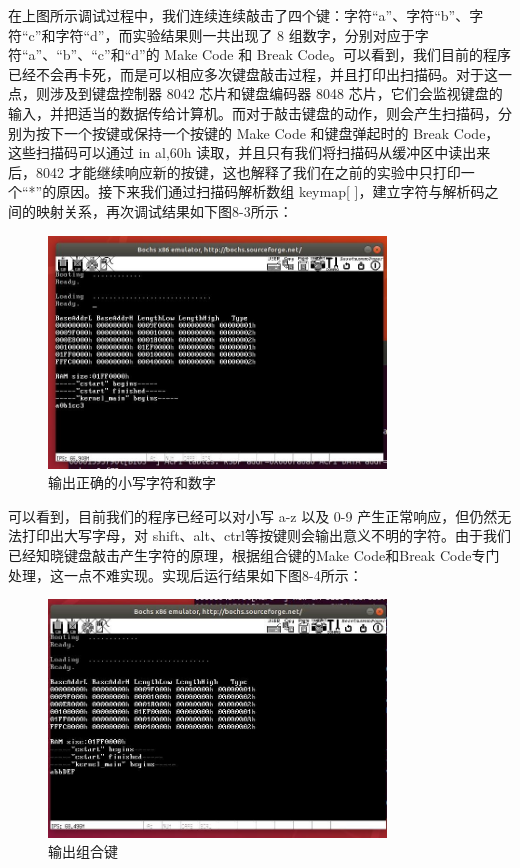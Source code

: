 在上图所示调试过程中，我们连续连续敲击了四个键：字符“a”、字符“b”、字符“c”和字符“d”，而实验结果则一共出现了 8 组数字，分别对应于字符“a”、“b”、“c”和“d”的 Make Code 和 Break Code。可以看到，我们目前的程序已经不会再卡死，而是可以相应多次键盘敲击过程，并且打印出扫描码。对于这一点，则涉及到键盘控制器 8042 芯片和键盘编码器 8048 芯片，它们会监视键盘的输入，并把适当的数据传给计算机。而对于敲击键盘的动作，则会产生扫描码，分别为按下一个按键或保持一个按键的 Make Code 和键盘弹起时的 Break Code，这些扫描码可以通过 in al,60h 读取，并且只有我们将扫描码从缓冲区中读出来后，8042 才能继续响应新的按键，这也解释了我们在之前的实验中只打印一个“*”的原因。接下来我们通过扫描码解析数组 keymap[ ]，建立字符与解析码之间的映射关系，再次调试结果如下图8-3所示：
\begin{figure}[H]
  \centering
  \includegraphics[width=0.8\textwidth]{figures/chapter8/8-3.jpg}
  \caption{输出正确的小写字符和数字}
  \label{fig:3}
\end{figure}

可以看到，目前我们的程序已经可以对小写 a-z 以及 0-9 产生正常响应，但仍然无法打印出大写字母，对 shift、alt、ctrl等按键则会输出意义不明的字符。由于我们已经知晓键盘敲击产生字符的原理，根据组合键的Make Code和Break Code专门处理，这一点不难实现。实现后运行结果如下图8-4所示：
\begin{figure}[H]
  \centering
  \includegraphics[width=0.8\textwidth]{figures/chapter8/8-4.jpg}
  \caption{输出组合键}
  \label{fig:4}
\end{figure}

